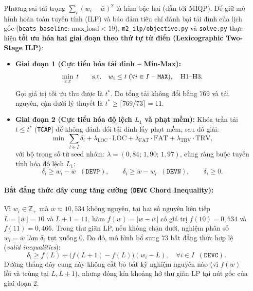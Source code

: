 Phương sai tải trọng $\sum_i (w_i - \bar{w})^2$ là hàm bậc hai (dẫn tới MIQP). Để giữ mô hình hoàn toàn tuyến tính (ILP) và bảo đảm tiêu chí đánh bại tải đỉnh của lịch gốc (\texttt{beats\_baseline}: $\text{max\_load} < 19$), \texttt{m2\_ilp/objective.py} và \texttt{solve.py} thực hiện \textbf{tối ưu hóa hai giai đoạn theo thứ tự từ điển (Lexicographic Two-Stage ILP)}:

\begin{itemize}
    \item \textbf{Giai đoạn 1 (Cực tiểu hóa tải đỉnh -- Min-Max):}
    \begin{equation}
        \min_{x, t} \; t \qquad \text{s.t.} \quad w_i \le t \; (\forall i \in I \text{ -- \texttt{MAX}}), \quad \text{H1--H3}.
    \end{equation}
    Gọi giá trị tối ưu thu được là $t^*$. Do tổng tải không đổi bằng $769$ và tải nguyên, cận dưới lý thuyết là $t^* \ge \lceil 769 / 73 \rceil = 11$.
    \item \textbf{Giai đoạn 2 (Cực tiểu hóa độ lệch $L_1$ và phạt mềm):} Khóa trần tải $t \le t^*$ (\texttt{TCAP}) để không đánh đổi tải đỉnh lấy phạt mềm, sau đó giải:
    \begin{equation}
        \min \; \sum_{i \in I} \delta_i + \lambda_{\text{LOC}} \cdot \text{LOC} + \lambda_{\text{FAT}} \cdot \text{FAT} + \lambda_{\text{TRV}} \cdot \text{TRV},
    \end{equation}
    với bộ trọng số từ seed nhóm: $\lambda = (0{,}84;\, 1{,}90;\, 1{,}97)$, cùng ràng buộc tuyến tính hóa độ lệch $L_1$:
    \begin{equation}
        \delta_i \ge w_i - \bar{w} \;\; (\texttt{DEVP}), \qquad \delta_i \ge \bar{w} - w_i \;\; (\texttt{DEVN}), \qquad \delta_i \ge 0.
    \end{equation}
\end{itemize}

\paragraph*{Bất đẳng thức dây cung tăng cường (\texttt{DEVC} Chord Inequality):}
Vì $w_i \in \mathbb{Z}_+$ mà $\bar{w} \approx 10{,}534$ không nguyên, tại hai số nguyên liên tiếp $L = \lfloor \bar{w} \rfloor = 10$ và $L+1 = 11$, hàm $f(w) = |w - \bar{w}|$ có giá trị $f(10) = 0{,}534$ và $f(11) = 0{,}466$. Trong thư giãn LP, nếu không chặn dưới, nghiệm phân số $w_i = \bar{w}$ làm $\delta_i$ tụt xuống $0$. Do đó, mô hình bổ sung $73$ bất đẳng thức hợp lệ (\textit{valid inequalities}):
\begin{equation}
    \delta_i \ge f(L) + \big(f(L+1) - f(L)\big)(w_i - L), \quad \forall i \in I \;\; (\texttt{DEVC}).
\end{equation}
Đường thẳng dây cung này không cắt bỏ bất kỳ nghiệm nguyên nào (vì $f(w)$ lồi và trùng tại $L, L+1$), nhưng đóng kín khoảng hở thư giãn LP tại nút gốc của giai đoạn 2.

